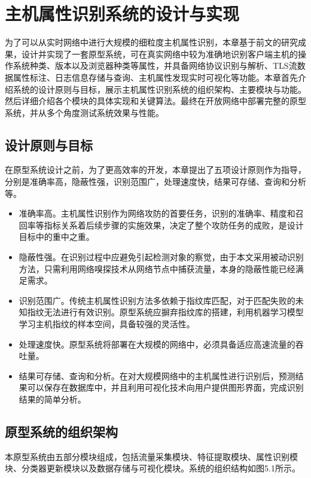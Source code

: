 \chapter{主机属性识别系统的设计与实现}

为了可以从实时网络中进行大规模的细粒度主机属性识别，本章基于前文的研究成果，设计并实现了一套原型系统，可在真实网络中较为准确地识别客户端主机的操作系统种类、版本以及浏览器种类等属性，并具备网络协议识别与解析、TLS流数据属性标注、日志信息存储与查询、主机属性发现实时可视化等功能。本章首先介绍系统的设计原则与目标，展示主机属性识别系统的组织架构、主要模块与功能。然后详细介绍各个模块的具体实现和关键算法。最终在开放网络中部署完整的原型系统，并从多个角度测试系统效果与性能。

\section{设计原则与目标}

在原型系统设计之前，为了更高效率的开发，本章提出了五项设计原则作为指导，分别是准确率高，隐蔽性强，识别范围广，处理速度快，结果可存储、查询和分析等。
\begin{itemize}

\item
准确率高。主机属性识别作为网络攻防的首要任务，识别的准确率、精度和召回率等指标关系着后续步骤的实施效果，决定了整个攻防任务的成败，是设计目标中的重中之重。
\item
隐蔽性强。在识别过程中应避免引起检测对象的察觉，由于本文采用被动识别方法，只需利用网络嗅探技术从网络节点中捕获流量，本身的隐蔽性能已经满足需求。
\item
识别范围广。传统主机属性识别方法多依赖于指纹库匹配，对于匹配失败的未知指纹无法进行有效识别。原型系统应摒弃指纹库的搭建，利用机器学习模型学习主机指纹的样本空间，具备较强的灵活性。
\item
处理速度快。原型系统将部署在大规模的网络中，必须具备适应高速流量的吞吐量。
\item
结果可存储、查询和分析。在对大规模网络中的主机属性进行识别后，预测结果可以保存在数据库中，并且利用可视化技术向用户提供图形界面，完成识别结果的简单分析。
\end{itemize}

\section{原型系统的组织架构}

本原型系统由五部分模块组成，包括流量采集模块、特征提取模块、属性识别模块、分类器更新模块以及数据存储与可视化模块。系统的组织结构如图5.1所示。

